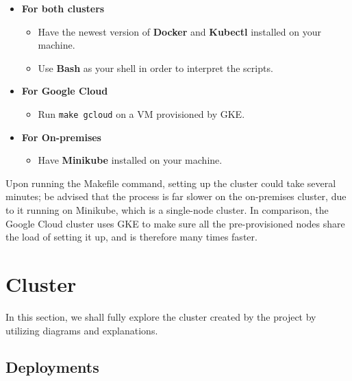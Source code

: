 \documentclass[thesis=B,english]{FITthesis}[2019/12/23]
\begin{document}
\begin{itemize}
  \setlength\itemsep{0em}
  \item \textbf{For both clusters}
  
  \begin{itemize}
    \setlength\itemsep{0em}
    \item Have the newest version of \textbf{Docker} and \textbf{Kubectl} installed on your machine.
    \item Use \textbf{Bash} as your shell in order to interpret the scripts.
  \end{itemize} 
  \item \textbf{For Google Cloud}
  
  \begin{itemize}
    \setlength\itemsep{0em}
    \item Run \verb|make gcloud| on a VM provisioned by GKE.
  \end{itemize}
  \item \textbf{For On-premises}
  
  \begin{itemize}
    \setlength\itemsep{0em}
    \item Have \textbf{Minikube} installed on your machine.
  \end{itemize}
\end{itemize}

Upon running the Makefile command, setting up the cluster could take several minutes; be advised that the process is far slower on the on-premises cluster, due to it running on Minikube, which is a single-node cluster. In comparison, the Google Cloud cluster uses GKE to make sure all the pre-provisioned nodes share the load of setting it up, and is therefore many times faster.

\section{Cluster}

In this section, we shall fully explore the cluster created by the project by utilizing diagrams and explanations. 

\subsection{Deployments}
\end{document}
